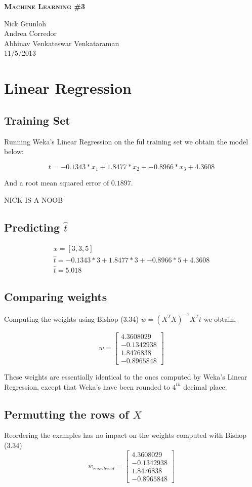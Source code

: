 \documentclass{article}
\newcommand{\header}[5]{
        \begin{minipage}[h!]{0.63\textwidth}
                \centering
                { \LARGE \textbf{ \textsc{#1} } }
        \end{minipage}
        \begin{minipage}[h!]{0.37\textwidth}
                \centering
                {#2}\\
                {#3}\\
        \end{minipage}
}
\begin{document}
\header{Machine Learning \#3}
       {Nick Grunloh\\Andrea Corredor\\Abhinav Venkateswar Venkataraman}
       {11/5/2013}
\\\\


\section{Linear Regression}

\subsection*{Training Set}
Running Weka's Linear Regression on the ful training set we obtain the model below:

 \[ t =    -0.1343 * x_{1} +  1.8477 * x_{2} + -0.8966 * x_{3} + 4.3608 \]

\noindent And a root mean squared error of $0.1897$. 

NICK IS A NOOB

\subsection*{Predicting $\hat{t}$}

\begin{align*}
 x = [3,3,5]  \\
 \hat{t} = -0.1343 * 3 +  1.8477 * 3 + -0.8966 * 5 + 4.3608  \\
\hat{t} = 5.018 
\end{align*}

\subsection*{Comparing weights}
Computing the weights using Bishop (3.34) $ w = (X^{T}X)^{-1}X^{T}t$  we obtain,

\[w = \begin{bmatrix}
       4.3608029  \\[0.3em]
       -0.1342938  \\[0.3em]
       1.8476838 \\[0.3em]
       -0.8965848
     \end{bmatrix} \]

These weights are essentially identical to the ones computed by Weka's Linear Regression, except that Weka's have been rounded to $4^{th}$ decimal place.

\subsection*{Permutting the rows of $X$}
Reordering the examples has no impact on the weights computed with Bishop (3.34)
\[w_{reordered} = \begin{bmatrix}
       4.3608029  \\[0.3em]
       -0.1342938  \\[0.3em]
       1.8476838 \\[0.3em]
       -0.8965848
     \end{bmatrix} \]
\end{document}

